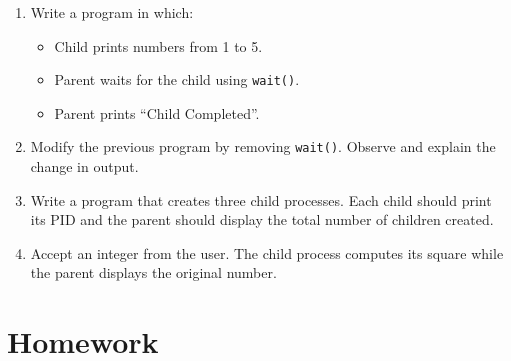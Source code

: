 \documentclass[12pt,a4paper]{article}
\begin{document}
\begin{enumerate}
Determine:
\begin{itemize}
    \item Number of processes.
    \item Number of times ``Linux'' is printed.
\end{itemize}

\item Write a program in which:
\begin{itemize}
    \item Child prints numbers from 1 to 5.
    \item Parent waits for the child using \texttt{wait()}.
    \item Parent prints ``Child Completed''.
\end{itemize}

\item Modify the previous program by removing \texttt{wait()}. Observe and explain the change in output.

\item Write a program that creates three child processes. Each child should print its PID and the parent should display the total number of children created.

\item Accept an integer from the user. The child process computes its square while the parent displays the original number.

\end{enumerate}


\section*{Homework}
\end{document}
